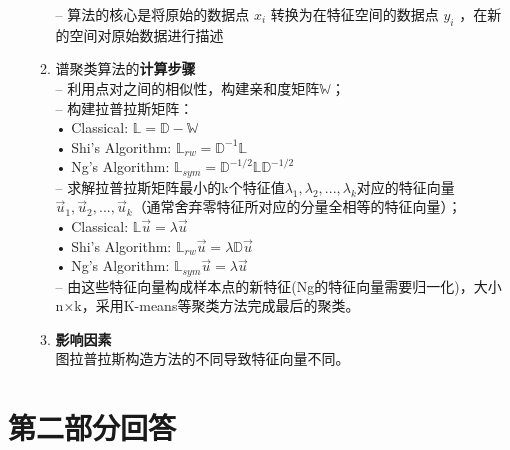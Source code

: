 \documentclass[a4paper,11pt,onecolumn,oneside,UTF8]{article}
\begin{document}
\begin{enumerate}
\begin{enumerate}[(1)]
                        – 算法的核心是将原始的数据点 $x_i$ 转换为在特征空间的数据点 $y_i$ ，在新的空间对原始数据进行描述
                  \item 谱聚类算法的\textbf{计算步骤}\\
                        – 利用点对之间的相似性，构建亲和度矩阵$\mathbb{W}$；\\
                        – 构建拉普拉斯矩阵：\\
                        \quad • Classical: $\mathbb{L} = \mathbb{D}-\mathbb{W}$\\
                        \quad • Shi's Algorithm: $\mathbb{L}_{rw} = \mathbb{D}^{-1}\mathbb{L}$\\
                        \quad • Ng's Algorithm: $\mathbb{L}_{sym} = \mathbb{D}^{-1/2}\mathbb{L}\mathbb{D}^{-1/2}$\\
                        – 求解拉普拉斯矩阵最小的k个特征值{$\lambda_1,\lambda_2,...,\lambda_k$}对应的特征向量{$\vec{u}_1,\vec{u}_2,...,\vec{u}_k$}（通常舍弃零特征所对应的分量全相等的特征向量）；\\
                        \quad • Classical: $\mathbb{L}\vec{u} =  \lambda \vec{u}$\\
                        \quad • Shi's Algorithm: $\mathbb{L}_{rw}\vec{u} =  \lambda \mathbb{D}\vec{u}$\\
                        \quad • Ng's Algorithm: $\mathbb{L}_{sym}\vec{u} =  \lambda \vec{u}$\\
                        – 由这些特征向量构成样本点的新特征(Ng的特征向量需要归一化)，大小n×k，采用K-means等聚类方法完成最后的聚类。
                  \item \textbf{影响因素}\\
                        图拉普拉斯构造方法的不同导致特征向量不同。
            \end{enumerate}
\end{enumerate}

\section*{第二部分回答}
\end{document}

